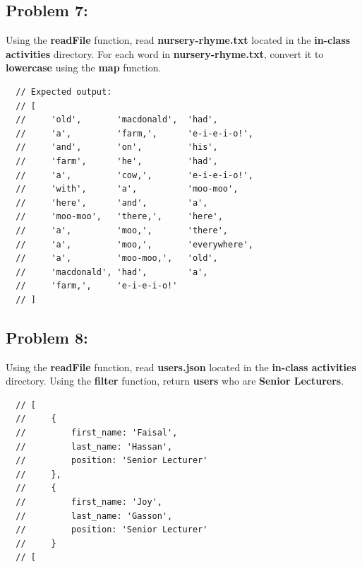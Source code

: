 \documentclass{article}
\begin{document}
\subsection*{Problem 7:} 
Using the \textbf{readFile} function, read \textbf{nursery-rhyme.txt} located in the \textbf{in-class activities} directory. For each word in \textbf{nursery-rhyme.txt}, convert it to \textbf{lowercase} using the \textbf{map} function.  

\begin{verbatim}
  // Expected output:
  // [
  //     'old',       'macdonald',  'had',
  //     'a',         'farm,',      'e-i-e-i-o!',
  //     'and',       'on',         'his',
  //     'farm',      'he',         'had',
  //     'a',         'cow,',       'e-i-e-i-o!',
  //     'with',      'a',          'moo-moo',
  //     'here',      'and',        'a',
  //     'moo-moo',   'there,',     'here',
  //     'a',         'moo,',       'there',
  //     'a',         'moo,',       'everywhere',
  //     'a',         'moo-moo,',   'old',
  //     'macdonald', 'had',        'a',
  //     'farm,',     'e-i-e-i-o!'
  // ]
\end{verbatim}

\subsection*{Problem 8:} 
Using the \textbf{readFile} function, read \textbf{users.json} located in the \textbf{in-class activities} directory. Using the \textbf{filter} function, return \textbf{users} who are \textbf{Senior Lecturers}.

\begin{verbatim}
  // [
  //     {
  //         first_name: 'Faisal',
  //         last_name: 'Hassan',
  //         position: 'Senior Lecturer'
  //     },
  //     {
  //         first_name: 'Joy',
  //         last_name: 'Gasson',
  //         position: 'Senior Lecturer'
  //     }
  // [
\end{verbatim}
\end{document}
